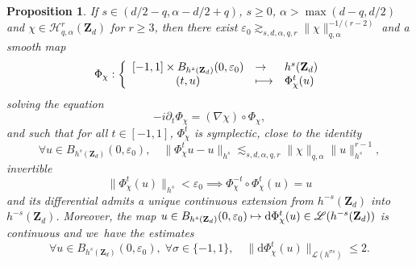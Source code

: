 \documentclass[11pt]{article}
\providecommand{\dpl}{\displaystyle}
\newcommand\mto{\mathchoice{\longmapsto}{\mapsto}{\mapsto}{\mapsto}}
\newtheorem{proposition}[theorem]{Proposition}
\theoremstyle{definition}
\begin{document}
\begin{proposition}
\label{prop_ham_flow} If $s\in (d/2-q, \alpha-d/2+q)$, $s\geq 0$, $\alpha >\max(d-q,d/2)$ and $\chi \in \mathscr{H}_{q,\alpha}^r(\mathbf{Z}_d)$ for $r\geq 3$, then there exist $ \varepsilon_0 \gtrsim_{s,d,\alpha,q,r} \|\chi \|_{q,\alpha}^{-1/(r-2)}$ and a smooth map
\[
\Phi_\chi: \left\{ \begin{array}{cll} [-1,1] \times B_{h^s(\mathbf{Z}_d)}(0,\varepsilon_0) &\dpl\to& h^s(\mathbf{Z}_d) \\ (t,u) &\dpl\mto& \Phi_\chi^t(u) \end{array} \right.
\]
solving the equation
\[
-i\partial_t \Phi_\chi = (\nabla \chi)\circ \Phi_\chi,
\]
and such that for all $t\in [-1,1]$, $\Phi_\chi^t$ is symplectic, close to the identity
\begin{equation}
\label{eq_dindon}
\forall u \in B_{h^s(\mathbf{Z}_d)}(0,\varepsilon_0), \quad \| \Phi_\chi^t u - u \|_{h^s} \lesssim_{s,d,\alpha,q,r} \|\chi \|_{q,\alpha} \| u \|_{h^s}^{r-1},
\end{equation}
invertible
\begin{equation}
\label{eq_invertibility}
\|\Phi_\chi^{t} (u) \|_{h^s} < \varepsilon_0 \implies \Phi_\chi^{-t}\circ \Phi_\chi^{t} (u) = u
\end{equation}
and its differential admits a unique continuous extension from $h^{-s}(\mathbf{Z}_d)$ into $h^{-s}(\mathbf{Z}_d)$. Moreover, the map $u\in B_{h^s(\mathbf{Z}_d)}(0,\varepsilon_0) \mto \mathrm{d} \Phi_\chi^t(u) \in \mathscr{L}(h^{-s}(\mathbf{Z}_d))$ is continuous and we~have the estimates
\begin{equation}
\label{eq_petanque}
\forall u \in B_{h^s(\mathbf{Z}_d)}(0,\varepsilon_0),\;\forall \sigma\in \{-1,1\},\quad \| \mathrm{d} \Phi_\chi^t (u)\|_{\mathscr{L}(h^{\sigma s})}\leq 2.
\end{equation}
\end{proposition}
\end{document}
